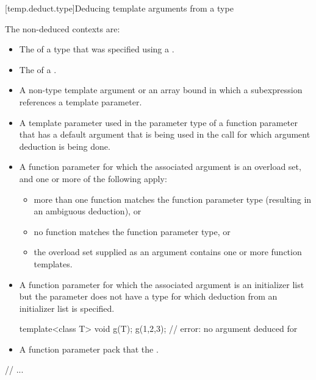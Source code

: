 \documentclass{wg21}
\begin{document}
[temp.deduct.type]{Deducing template arguments from a type}

\pnum
The non-deduced contexts are:

%
\begin{itemize}
\item
The
of a type that was specified using a
.
\item
The  of a .
\item
A non-type template argument or an array bound in which a subexpression
references a template parameter.
\item
A template parameter used in the parameter type of a function parameter that
has a default argument that is being used in the call for which argument
deduction is being done.
\item
A function parameter for which the associated argument is an
overload set, and one or more of the following apply:
\begin{itemize}
    \item
    more than one function matches the function parameter type (resulting in
    an ambiguous deduction), or
    \item
    no function matches the function parameter type, or
    \item
    the overload set supplied as an argument contains one or more function templates.
\end{itemize}
\item A function parameter for which the associated argument is an initializer
list but the parameter does not have
a type for which deduction from an initializer list is specified.
\begin{example}
    \begin{codeblock}
        template<class T> void g(T);
        g({1,2,3});                 // error: no argument deduced for 
    \end{codeblock}
\end{example}
\item A function parameter pack that  the .
\end{itemize}

// ...

\pnum

\end{document}
